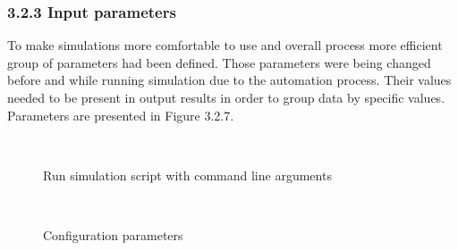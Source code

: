 \subsubsection{\hspace*{0.5cm}3.2.3 Input parameters}
\textnormal{\hspace{0.5cm}To make simulations more comfortable to use and overall process more efficient group of parameters had been defined. Those parameters were being changed before and while running simulation due to the automation process. Their values needed to be present in output results in order to group data by specific values. Parameters are presented in Figure 3.2.7.}
\begin{center}
	\begin{figure}[h]
		\centering
		\\
		\caption{Run simulation script with command line arguments}
	\end{figure}
\end{center}
\begin{center}
	\begin{figure}[h]
		\centering
		\\
		\caption{Configuration parameters}
	\end{figure}
\end{center}    
